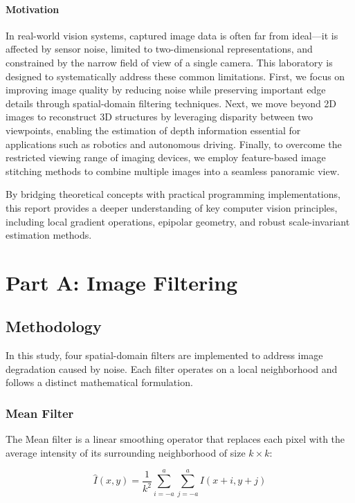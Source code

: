 \documentclass[a4paper,12pt]{article}
\begin{document}
\paragraph{Motivation}
In real-world vision systems, captured image data is often far from ideal—it is affected by sensor noise, limited to two-dimensional representations, and constrained by the narrow field of view of a single camera. This laboratory is designed to systematically address these common limitations. First, we focus on improving image quality by reducing noise while preserving important edge details through spatial-domain filtering techniques. Next, we move beyond 2D images to reconstruct 3D structures by leveraging disparity between two viewpoints, enabling the estimation of depth information essential for applications such as robotics and autonomous driving. Finally, to overcome the restricted viewing range of imaging devices, we employ feature-based image stitching methods to combine multiple images into a seamless panoramic view.

By bridging theoretical concepts with practical programming implementations, this report provides a deeper understanding of key computer vision principles, including local gradient operations, epipolar geometry, and robust scale-invariant estimation methods.

\section{Part A: Image Filtering}
\subsection{Methodology}

In this study, four spatial-domain filters are implemented to address image degradation caused by noise. Each filter operates on a local neighborhood and follows a distinct mathematical formulation.

\subsubsection{Mean Filter}

The Mean filter is a linear smoothing operator that replaces each pixel with the average intensity of its surrounding neighborhood of size $k \times k$:

\begin{equation}
\hat{I}(x,y) = \frac{1}{k^2} \sum_{i=-a}^{a} \sum_{j=-a}^{a} I(x+i, y+j)
\end{equation}
\end{document}
